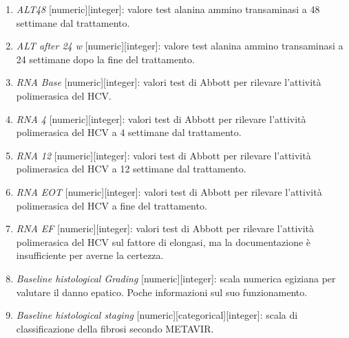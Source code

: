 \documentclass[italian,12pt,a4paper]{article}
\begin{document}
\begin{enumerate}
    \item \textit{ALT48} [numeric][integer]: valore test alanina ammino transaminasi a 48 settimane dal trattamento.
    \item \textit{ALT after 24 w} [numeric][integer]: valore test alanina ammino transaminasi a 24 settimane dopo la fine del trattamento.
    \item \textit{RNA Base} [numeric][integer]: valori test di Abbott per rilevare l'attività polimerasica del HCV.
    \item \textit{RNA 4} [numeric][integer]: valori test di Abbott per rilevare l'attività polimerasica del HCV a 4 settimane dal trattamento.
    \item \textit{RNA 12} [numeric][integer]: valori test di Abbott per rilevare l'attività polimerasica del HCV a 12 settimane dal trattamento.
    \item \textit{RNA EOT} [numeric][integer]: valori test di Abbott per rilevare l'attività polimerasica del HCV a fine del trattamento.
    \item \textit{RNA EF} [numeric][integer]: valori test di Abbott per rilevare l'attività polimerasica del HCV sul fattore di elongasi, ma la documentazione è insufficiente per averne la certezza.
    \item \textit{Baseline histological Grading} [numeric][integer]: scala numerica egiziana per valutare il danno epatico. Poche informazioni sul suo funzionamento.
    \item \textit{Baseline histological staging} [numeric][categorical][integer]: scala di classificazione della fibrosi secondo METAVIR.
\end{enumerate}

\vspace{25pt}
\end{document}
